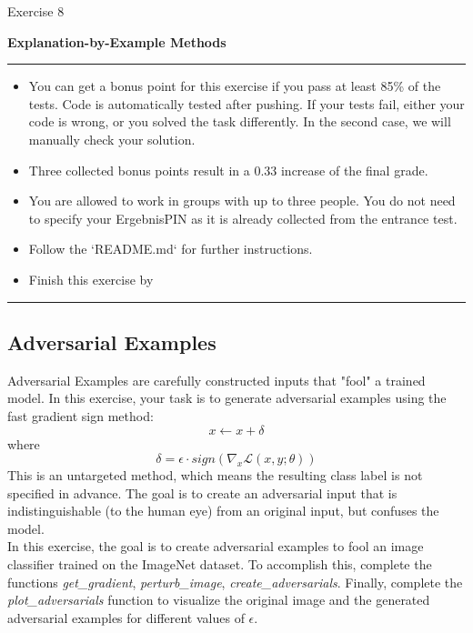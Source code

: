 \documentclass[a4paper]{article}
\begin{document}
{\noindent\LARGE Exercise 8\par}
\vspace{8pt}
{\noindent\huge\textbf{Explanation-by-Example Methods}}
\vspace{20pt}

\par\noindent\rule{\textwidth}{0.2pt}
\begin{itemize}
    \item You can get a bonus point for this exercise if you pass at least 85\% of the tests. Code is automatically tested after pushing. If your tests fail, either your code is wrong, or you solved the task differently. In the second case, we will manually check your solution.
    \item Three collected bonus points result in a 0.33 increase of the final grade.
    \item You are allowed to work in groups with up to three people. You do not need to specify your ErgebnisPIN as it is already collected from the entrance test.
    \item Follow the `README.md` for further instructions.
    \item Finish this exercise by \color{red}{8th December, 2021 at 11:59 pm.}
\end{itemize}
\par\noindent\rule{\textwidth}{0.2pt}
\vspace{10pt}

\noindent
\subsection*{Adversarial Examples}
Adversarial Examples are carefully constructed inputs that "fool" a trained model.
In this exercise, your task is to generate adversarial examples using the fast gradient sign method:
\begin{equation}
    x \leftarrow x + \delta
\end{equation}
where
\begin{equation}
    \delta = \epsilon \cdot sign(\nabla_x \mathcal{L}(x, y; \theta))
\end{equation}
This is an untargeted method, which means the resulting class label is not specified in advance.
The goal is to create an adversarial input that is indistinguishable (to the human eye) from an original input, but confuses the model.\\
\noindent
In this exercise, the goal is to create adversarial examples to fool an image classifier trained on the ImageNet dataset.
To accomplish this, complete the functions \textit{get\_gradient}, \textit{perturb\_image}, \textit{create\_adversarials}.
Finally, complete the \textit{plot\_adversarials} function to visualize the original image and the generated adversarial examples for different values of $\epsilon$.\\
\end{document}
